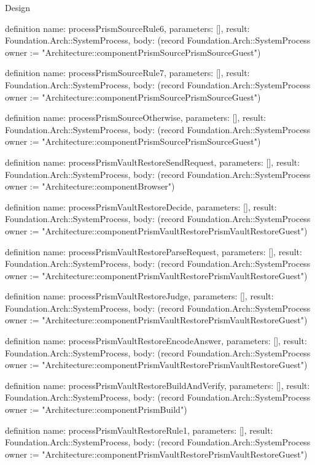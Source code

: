 \begin{lexlean}{Design}
\begin{semanticmodule}
definition{
  name: processPrismSourceRule6,
  parameters: [],
  result: Foundation.Arch::SystemProcess,
  body: (record Foundation.Arch::SystemProcess {owner := "Architecture::componentPrismSourcePrismSourceGuest"})
}

definition{
  name: processPrismSourceRule7,
  parameters: [],
  result: Foundation.Arch::SystemProcess,
  body: (record Foundation.Arch::SystemProcess {owner := "Architecture::componentPrismSourcePrismSourceGuest"})
}

definition{
  name: processPrismSourceOtherwise,
  parameters: [],
  result: Foundation.Arch::SystemProcess,
  body: (record Foundation.Arch::SystemProcess {owner := "Architecture::componentPrismSourcePrismSourceGuest"})
}

definition{
  name: processPrismVaultRestoreSendRequest,
  parameters: [],
  result: Foundation.Arch::SystemProcess,
  body: (record Foundation.Arch::SystemProcess {owner := "Architecture::componentBrowser"})
}

definition{
  name: processPrismVaultRestoreDecide,
  parameters: [],
  result: Foundation.Arch::SystemProcess,
  body: (record Foundation.Arch::SystemProcess {owner := "Architecture::componentPrismVaultRestorePrismVaultRestoreGuest"})
}

definition{
  name: processPrismVaultRestoreParseRequest,
  parameters: [],
  result: Foundation.Arch::SystemProcess,
  body: (record Foundation.Arch::SystemProcess {owner := "Architecture::componentPrismVaultRestorePrismVaultRestoreGuest"})
}

definition{
  name: processPrismVaultRestoreJudge,
  parameters: [],
  result: Foundation.Arch::SystemProcess,
  body: (record Foundation.Arch::SystemProcess {owner := "Architecture::componentPrismVaultRestorePrismVaultRestoreGuest"})
}

definition{
  name: processPrismVaultRestoreEncodeAnswer,
  parameters: [],
  result: Foundation.Arch::SystemProcess,
  body: (record Foundation.Arch::SystemProcess {owner := "Architecture::componentPrismVaultRestorePrismVaultRestoreGuest"})
}

definition{
  name: processPrismVaultRestoreBuildAndVerify,
  parameters: [],
  result: Foundation.Arch::SystemProcess,
  body: (record Foundation.Arch::SystemProcess {owner := "Architecture::componentPrismBuild"})
}

definition{
  name: processPrismVaultRestoreRule1,
  parameters: [],
  result: Foundation.Arch::SystemProcess,
  body: (record Foundation.Arch::SystemProcess {owner := "Architecture::componentPrismVaultRestorePrismVaultRestoreGuest"})
}


\end{semanticmodule}
\end{lexlean}
